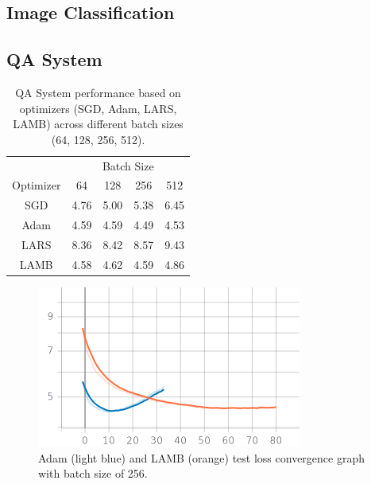 \subsection{Image Classification}


\subsection{QA System}

\begin{table}[!t]
\vspace{-5pt}
\small
\vspace{7pt}
\caption{QA System performance based on optimizers (SGD, Adam, LARS, LAMB) across different batch sizes (64, 128, 256, 512).}\label{tbl:results}
\vspace{-10pt}
\begin{center}
\begin{tabular}{ c|c|c|c|c}
\multicolumn{1}{c|}{} &  \multicolumn{4}{c}{Batch Size}\\ \cline{2-5}
\multicolumn{1}{c|}{Optimizer} &
 \multicolumn{1}{c|}{64} &
 \multicolumn{1}{c|}{128} &
 \multicolumn{1}{c|}{256} &
 \multicolumn{1}{c}{512} \\
\hline
SGD & 4.76 & 5.00 & 5.38 & 6.45\\
Adam &  4.59 & \cellcolor{gray!30} 4.59 &  \cellcolor{gray!30} 4.49 & \cellcolor{gray!30} 4.53\\
LARS & 8.36 & 8.42 & 8.57 & 9.43\\
LAMB & \cellcolor{gray!30} 4.58 & 4.62 & 4.59 & 4.86\\
\end{tabular}
\end{center}
\vspace{-15pt}
\end{table}

\begin{figure}[!t]
    \centering
    \includegraphics[width=0.7\linewidth]{img/adam_blue_lamb_orange_drqa_256.png}
    \caption{Adam (light blue) and LAMB (orange) test loss convergence graph with batch size of 256.}
    \label{fig:256}
\end{figure}

